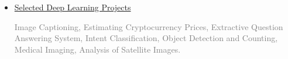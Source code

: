 \documentclass[11pt,a4paper,sans]{moderncv} %
\begin{document}
\begin{itemize}
			
			
  	\vspace{1em}
		\item \href{https://github.com/MJAHMADEE/DeepLearning2022}{ Selected Deep Learning Projects} 
        
        \textcolor{gray}{Image Captioning, Estimating Cryptocurrency Prices, Extractive Question Answering System, Intent Classification, Object Detection and Counting, Medical Imaging,  Analysis of Satellite Images.}
        


  
  


\end{itemize}
\end{document}
